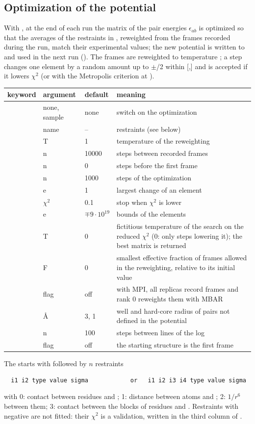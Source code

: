 \documentclass[11pt,a4paper]{article}
\newenvironment{keywords}
 {\begin{longtable}{>{\raggedright}p{0.2\textwidth}>{\raggedright}p{0.12\textwidth}>{\raggedright}p{0.14\textwidth}p{0.41\textwidth}}
  \toprule keyword & argument & default & meaning \\ \midrule \endhead
  \bottomrule \endfoot}
 {\end{longtable}}
\newcommand{\key}[4]{\kw{#1} & #2 & #3 & #4 \\}
\begin{document}
\subsection{Optimization of the potential}
\label{sec:optim}
With , at the end of each run the matrix of the pair
energies $\epsilon_{ab}$ is optimized so that the averages of the
restraints in , reweighted from the frames recorded during the
run, match their experimental values; the new potential is written to
 and used in the next run (). The frames are
reweighted to temperature ; a step changes one element by a
random amount up to $\pm$/2 within
[,] and is accepted if it lowers $\chi^2$ (or with
the Metropolis criterion at ).
\begin{keywords}
\key{op_minim}{none, sample}{none}{switch on the optimization}
\key{op_file}{name}{--}{restraints (see below)}
\key{op_T}{T}{1}{temperature of the reweighting}
\key{op_deltat}{n}{10000}{steps between recorded frames}
\key{op_wait}{n}{0}{steps before the first frame}
\key{op_itermax}{n}{1000}{steps of the optimization}
\key{op_step}{e}{1}{largest change of an element}
\key{op_stop}{$\chi^2$}{0.1}{stop when $\chi^2$ is lower}
\key{op_emin, op_emax}{e}{$\mp9\cdot10^{19}$}{bounds of the elements}
\key{op_tchi2}{T}{0}{fictitious temperature of the search on the reduced $\chi^2$ (0: only steps lowering it); the best matrix is returned}
\key{op_neff}{F}{0}{smallest effective fraction of frames allowed in the reweighting, relative to its initial value}
\key{op_allreplicas}{flag}{off}{with MPI, all replicas record frames and rank 0 reweights them with MBAR}
\key{op_rw, op_r0}{\AA}{3, 1}{well and hard-core radius of pairs not defined in the potential}
\key{op_print}{n}{100}{steps between lines of the log}
\key{record_native}{flag}{off}{the starting structure is the first frame}
\end{keywords}
The  starts with  followed by $n$ restraints
\begin{Verbatim}
  i1 i2 type value sigma            or   i1 i2 i3 i4 type value sigma
\end{Verbatim}
with  0: contact between residues  and ; 1:
distance between atoms  and ; 2: $1/r^6$ between them; 3:
contact between the blocks of residues  and .
Restraints with negative  are not fitted: their $\chi^2$ is a
validation, written in the third column of .
\end{document}
